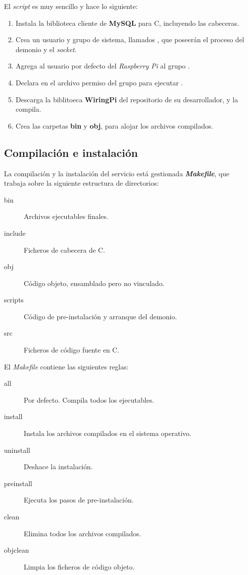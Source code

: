 El \textit{script} es muy sencillo y hace lo siguiente:

\begin{enumerate}
	\item Instala la biblioteca cliente de \textbf{MySQL} para C, incluyendo las cabeceras.
	\item Crea un usuario y grupo de sistema, llamados , que poseerán el proceso del demonio y el \textit{socket}.
	\item Agrega al usuario por defecto del \textit{Raspberry Pi} al grupo .
	\item Declara en el archivo  permiso del grupo  para ejecutar .
	\item Descarga la biblitoeca \textbf{WiringPi} del repositorio de su desarrollador, y la compila.
	\item Crea las carpetas \textbf{bin} y \textbf{obj}, para alojar los archivos compilados.
\end{enumerate}

\subsection{Compilación e instalación}

La compilación y la instalación del servicio está gestionada \textbf{\textit{Makefile}}, que trabaja sobre la siguiente estructura de directorios:

\begin{description}
	\item[bin] Archivos ejecutables finales.
	\item[include] Ficheros de cabecera de C.
	\item[obj] Código objeto, ensamblado pero no vinculado.
	\item[scripts] Código de pre-instalación y arranque del demonio.
	\item[src] Ficheros de código fuente en C.
\end{description}

El \textit{Makefile} contiene las siguientes reglas:

\begin{description}
	\item[all] Por defecto. Compila todos los ejecutables.
	\item[install] Instala los archivos compilados en el sistema operativo.
	\item[uninstall] Deshace la instalación.
	\item[preinstall] Ejecuta los pasos de pre-instalación.
	\item[clean] Elimina todos los archivos compilados.
	\item[objclean] Limpia los ficheros de código objeto.
\end{description}

